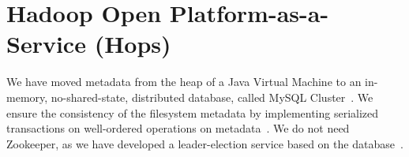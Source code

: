 \section{Hadoop Open Platform-as-a-Service (Hops)}

We have moved metadata from the heap of a Java Virtual Machine to an in-memory, no-shared-state, distributed database, called MySQL Cluster~\cite{ronstrom2005recovery}. We ensure the consistency of the filesystem metadata by implementing serialized transactions on well-ordered operations on metadata~\cite{hops_consistency}.
We do not need Zookeeper, as we have developed a leader-election service based on the database~\cite{hopselection}.